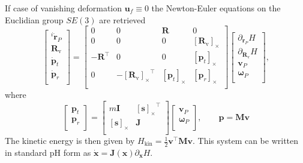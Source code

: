 \documentclass{svjour3}                     %
\newcommand{\crmat}[1]{\ensuremath{[#1]_{\times}}}
\begin{document}
\begin{remark}
If case of vanishing deformation $\bm{u}_f \equiv 0$ the Newton-Euler equations on the Euclidian group $SE(3)$ are retrieved
\begin{equation*}
\begin{bmatrix}
^i\dot{\bm{r}}_P \\ \bm{R}_{\text{v}} \\\dot{\bm{p}}_t \\ \dot{\bm{p}}_r \\
\end{bmatrix} = 
\begin{bmatrix}
0 & 0 & \bm{R} & 0 \\
0 & 0 & 0 & \crmat{\bm{R}_{\text{v}}} \\
- \bm{R}^\top & 0 & 0 & \crmat{\bm{p}_t}\\
0 & -\crmat{\bm{R}_{\text{v}}}^\top & \crmat{\bm{p}_t} & \crmat{\bm{p}_r} \\
\end{bmatrix}
\begin{bmatrix}
\partial_{\bm{r}_P} H \\ \partial_{\bm{R}_{\text{v}}} H \\ \bm{v}_P \\ \bm{\omega}_P  \\
\end{bmatrix},
\end{equation*}
where
\begin{equation*}
\begin{bmatrix}
\bm{p}_t \\ \bm{p}_r \\ 
\end{bmatrix} = 
\begin{bmatrix}
m \bm{I} & \crmat{\bm{s}}^\top \\
\crmat{\bm{s}} & \bm{J} \\
\end{bmatrix}
\begin{bmatrix}
\bm{v}_P \\ \bm{\omega}_P  \\ 
\end{bmatrix}, \qquad \bm{p} = \bm{M} \bm{v}
\end{equation*}
The kinetic energy is then given by $H_{\text{kin}} = \frac{1}{2} \bm{v}^\top \bm{M} \bm{v}$.
This system can be written in standard pH form as $\dot{\bm{x}} = \bm{J}(\bm{x})\partial_{\bm{x}} H$.
\end{remark}
\end{document}
